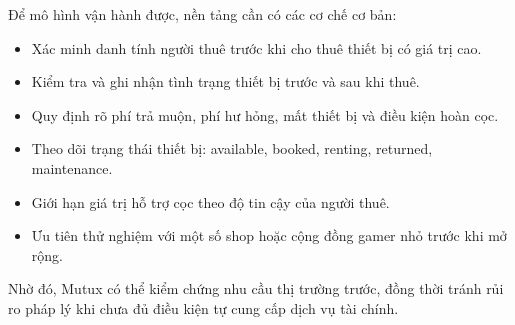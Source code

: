 Để mô hình vận hành được, nền tảng cần có các cơ chế cơ bản:

\begin{itemize}
    \item Xác minh danh tính người thuê trước khi cho thuê thiết bị có giá trị cao.
    \item Kiểm tra và ghi nhận tình trạng thiết bị trước và sau khi thuê.
    \item Quy định rõ phí trả muộn, phí hư hỏng, mất thiết bị và điều kiện hoàn cọc.
    \item Theo dõi trạng thái thiết bị: available, booked, renting, returned, maintenance.
    \item Giới hạn giá trị hỗ trợ cọc theo độ tin cậy của người thuê.
    \item Ưu tiên thử nghiệm với một số shop hoặc cộng đồng gamer nhỏ trước khi mở rộng.
\end{itemize}

Nhờ đó, Mutux có thể kiểm chứng nhu cầu thị trường trước, đồng thời tránh rủi ro pháp lý khi chưa đủ điều kiện tự cung cấp dịch vụ tài chính.
